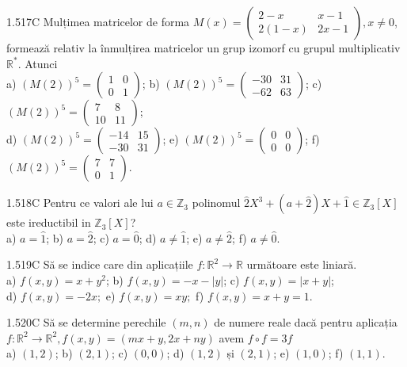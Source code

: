 \documentclass[11pt]{article}
\begin{document}
1.517C Mulțimea matricelor de forma $M(x)=\left(\begin{array}{cc}2-x & x-1 \\ 2(1-x) & 2 x-1\end{array}\right), x \neq 0$, formează relativ la înmulțirea matricelor un grup izomorf cu grupul multiplicativ $\mathbb{R}^{*}$. Atunci\\ a) $(M(2))^{5}=\left(\begin{array}{cc}1 & 0 \\ 0 & 1\end{array}\right) $; b) $(M(2))^{5}=\left(\begin{array}{cc}-30 & 31 \\ -62 & 63\end{array}\right)$; c) $(M(2))^{5}=\left(\begin{array}{cc}7 & 8 \\ 10 & 11\end{array}\right)$;\\ d) $(M(2))^{5}=\left(\begin{array}{rr}-14 & 15 \\ -30 & 31\end{array}\right)$; e) $(M(2))^{5}=\left(\begin{array}{ll}0 & 0 \\ 0 & 0\end{array}\right)$; f) $(M(2))^{5}=\left(\begin{array}{ll}7 & 7 \\ 0 & 1\end{array}\right)$.

1.518C Pentru ce valori ale lui $a \in \mathbb{Z}_{3}$ polinomul $\hat{2} X^{3}+(a+\hat{2}) X+\hat{1} \in \mathbb{Z}_{3}[X]$ este ireductibil in $\mathbb{Z}_{3}[X]$?\\ a) $a=\hat{1}$; b) $a=\hat{2}$; c) $a=\hat{0}$; d) $a \neq \hat{1}$; e) $a \neq \hat{2}$; f) $a \neq \hat{0}$.

1.519C Să se indice care din aplicațiile $f: \mathbb{R}^{2} \rightarrow \mathbb{R}$ următoare este liniară.\\ a) $f(x, y)=x+y^{2}$; b) $f(x, y)=-x-|y|$; c) $f(x, y)=|x+y|$;\\ d) $f(x, y)=-2 x ;$ e) $f(x, y)=x y ;$ f) $f(x, y)=x+y=1$.

1.520C Să se determine perechile $(m, n)$ de numere reale dacă pentru aplicația $f: \mathbb{R}^{2} \rightarrow \mathbb{R}^{2}, f(x, y)=(m x+y, 2 x+n y)$ avem $f \circ f=3 f$\\ a) $(1,2)$; b) $(2,1)$; c) $(0,0)$; d) $(1,2)$ și $(2,1)$; e) $(1,0)$; f) $(1,1)$.
\end{document}
